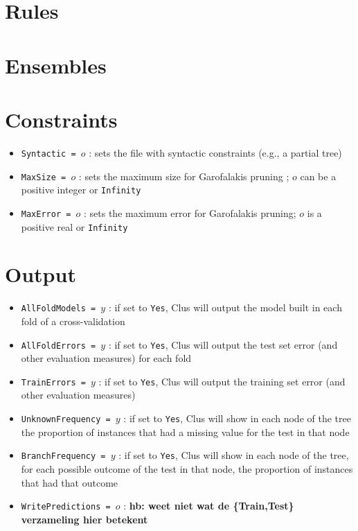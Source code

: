 \documentclass[a4paper]{report}
\begin{document}
\section{Rules}


\section{Ensembles}

\section{Constraints}

\begin{itemize}
\item {\tt Syntactic = $o$} : sets the file with syntactic constraints (e.g., a partial tree) \cite{Struyf06-KDID:proc}
\item {\tt MaxSize = $o$} : sets the maximum size for Garofalakis pruning \cite{Garofalakis03:jrnl, Struyf06-KDID:proc}; $o$ can be a positive integer or {\tt Infinity}
\item {\tt MaxError = $o$} : sets the maximum error for Garofalakis pruning; $o$ is a positive real or {\tt Infinity}
\end{itemize}

\section{Output}

\begin{itemize}
\item {\tt AllFoldModels = $y$} : if set to {\tt Yes}, Clus will output the model built in each fold of a cross-validation
\item {\tt AllFoldErrors = $y$} : if set to {\tt Yes}, Clus will output the test set error (and other evaluation measures) for each fold
\item {\tt TrainErrors = $y$} : if set to {\tt Yes}, Clus will output the training set error (and other evaluation measures)
\item {\tt UnknownFrequency = $y$} : if set to {\tt Yes}, Clus will show in each node of the tree the proportion of instances that had a missing value for the test in that node
\item {\tt BranchFrequency = $y$} : if set to {\tt Yes}, Clus will show in each node of the tree, for each possible outcome of the test in that node, the proportion of instances that had that outcome
\item {\tt WritePredictions = $o$} : {\bf * hb: weet niet wat de \{Train,Test\} verzameling hier betekent}
\end{itemize}
\end{document}
